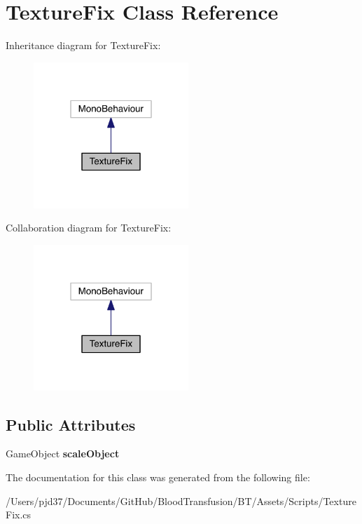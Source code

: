 \hypertarget{class_texture_fix}{}\section{Texture\+Fix Class Reference}
\label{class_texture_fix}


Inheritance diagram for Texture\+Fix\+:\nopagebreak
\begin{figure}[H]
\begin{center}
\leavevmode
\includegraphics[width=166pt]{class_texture_fix__inherit__graph}
\end{center}
\end{figure}


Collaboration diagram for Texture\+Fix\+:\nopagebreak
\begin{figure}[H]
\begin{center}
\leavevmode
\includegraphics[width=166pt]{class_texture_fix__coll__graph}
\end{center}
\end{figure}
\subsection*{Public Attributes}
\begin{DoxyCompactItemize}
\item 
Game\+Object {\bfseries scale\+Object}\hypertarget{class_texture_fix_aeea28b8e318b6f75fc23767661617055}{}\label{class_texture_fix_aeea28b8e318b6f75fc23767661617055}

\end{DoxyCompactItemize}


The documentation for this class was generated from the following file\+:\begin{DoxyCompactItemize}
\item 
/\+Users/pjd37/\+Documents/\+Git\+Hub/\+Blood\+Transfusion/\+B\+T/\+Assets/\+Scripts/Texture\+Fix.\+cs\end{DoxyCompactItemize}
